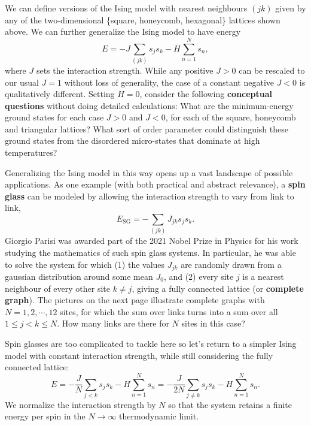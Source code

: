 \documentclass[12 pt]{article} %
\begin{document}
We can define versions of the Ising model with nearest neighbours $(jk)$ given by any of the two-dimensional \{square, honeycomb, hexagonal\} lattices shown above.
We can further generalize the Ising model to have energy
\begin{equation*}
  E = -J \sum_{(jk)} s_j s_k - H \sum_{n = 1}^N s_n,
\end{equation*}
where $J$ sets the interaction strength.
While any positive $J > 0$ can be rescaled to our usual $J = 1$ without loss of generality, the case of a constant negative $J < 0$ is qualitatively different.
Setting $H = 0$, consider the following \textbf{conceptual questions} without doing detailed calculations:
What are the minimum-energy ground states for each case $J > 0$ and $J < 0$, for each of the square, honeycomb and triangular lattices?
What sort of order parameter could distinguish these ground states from the disordered micro-states that dominate at high temperatures?

Generalizing the Ising model in this way opens up a vast landscape of possible applications.
As one example (with both practical and abstract relevance), a \textbf{spin glass} can be modeled by allowing the interaction strength to vary from link to link,
\begin{equation*}
  E_{\text{SG}} = -\sum_{(jk)} J_{jk} s_j s_k.
\end{equation*}
Giorgio Parisi was awarded part of the 2021 Nobel Prize in Physics for his work studying the mathematics of such spin glass systems.
In particular, he was able to solve the system for which (1) the values $J_{jk}$ are randomly drawn from a gaussian distribution around some mean $J_0$, and (2) every site $j$ is a nearest neighbour of every other site $k \ne j$, giving a fully connected lattice (or \textbf{complete graph}).
The pictures on the next page illustrate complete graphs with $N = 1, 2, \cdots, 12$ sites, for which the sum over links turns into a sum over all $1 \leq j < k \leq N$.
How many links are there for $N$ sites in this case?

Spin glasses are too complicated to tackle here so let's return to a simpler Ising model with constant interaction strength, while still considering the fully connected lattice:
\begin{equation*}
  E = -\frac{J}{N} \sum_{j < k} s_j s_k - H \sum_{n = 1}^N s_n = -\frac{J}{2N} \sum_{j \neq k} s_j s_k - H \sum_{n = 1}^N s_n.
\end{equation*}
We normalize the interaction strength by $N$ so that the system retains a finite energy per spin in the $N \to \infty$ thermodynamic limit.
\end{document}
